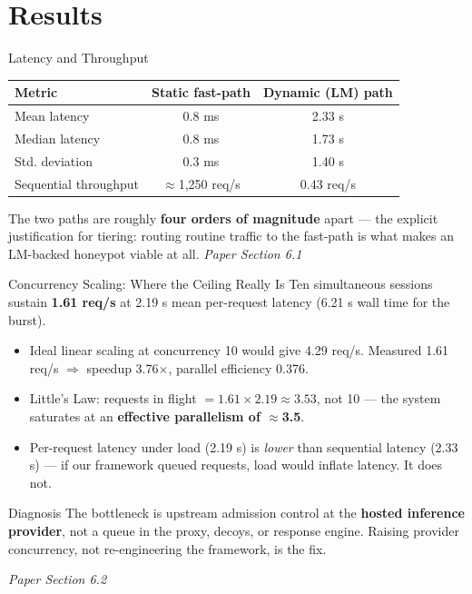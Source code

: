 \documentclass[aspectratio=169, 11pt]{beamer}
\newcommand{\srcnote}[1]{{\footnotesize\color{gray}\textit{#1}}}
\begin{document}
\section{Results}
\begin{frame}{Latency and Throughput}
    \scriptsize
    \renewcommand{\arraystretch}{1.2}
    \begin{tabular}{|l|c|c|}
        \hline
        \textbf{Metric} & \textbf{Static fast-path} & \textbf{Dynamic (LM) path} \\
        \hline
        Mean latency & 0.8 ms & 2.33 s \\
        \hline
        Median latency & 0.8 ms & 1.73 s \\
        \hline
        Std. deviation & 0.3 ms & 1.40 s \\
        \hline
        Sequential throughput & $\approx$1{,}250 req/s & 0.43 req/s \\
        \hline
    \end{tabular}
    \vspace{3mm}
    \normalsize
    The two paths are roughly \textbf{four orders of magnitude} apart --- the explicit justification for tiering: routing routine traffic to the fast-path is what makes an LM-backed honeypot viable at all.
    \vspace{2mm}
    \srcnote{Paper Section 6.1}
\end{frame}

\begin{frame}{Concurrency Scaling: Where the Ceiling Really Is}
    Ten simultaneous sessions sustain \textbf{1.61 req/s} at 2.19 s mean per-request latency (6.21 s wall time for the burst).
    \begin{itemize}
        \item Ideal linear scaling at concurrency 10 would give 4.29 req/s. Measured 1.61 req/s $\Rightarrow$ speedup 3.76$\times$, parallel efficiency 0.376.
        \item Little's Law: requests in flight $= 1.61 \times 2.19 \approx 3.53$, not 10 --- the system saturates at an \textbf{effective parallelism of $\approx$3.5}.
        \item Per-request latency under load (2.19 s) is \emph{lower} than sequential latency (2.33 s) --- if our framework queued requests, load would inflate latency. It does not.
    \end{itemize}
    \begin{block}{\small Diagnosis}
        \small The bottleneck is upstream admission control at the \textbf{hosted inference provider}, not a queue in the proxy, decoys, or response engine. Raising provider concurrency, not re-engineering the framework, is the fix.
    \end{block}
    \srcnote{Paper Section 6.2}
\end{frame}
\end{document}

